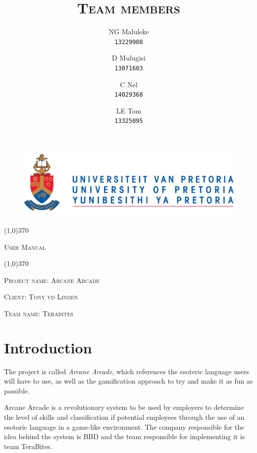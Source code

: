 \documentclass[english]{article}
\title{\scshape\Large Team members}
\author{
	NG Maluleke\\
	\texttt{13229908}
	\and
	D Mulugisi\\
	\texttt{13071603}
	\and
	C Nel\\
	\texttt{14029368}
	\and
	LE Tom\\
	\texttt{13325095}
}
\begin{document}
	
	\begin{figure}
		\includegraphics[width=\linewidth]{up_logo.png}
	\end{figure}
	
	\begin{center}
	 \line(1,0){370}
	\\[0.2cm]
    {\scshape\Large User Manual \par}
	\vspace{0.1cm}
	\line(1,0){370}
	\\[0.8cm]
	
	{\scshape\large Project name: Arcane Arcade\par}	
	\vspace{1cm}
	{\scshape\large Client: Tony vd Linden\par}
	\vspace{1cm}
	{\scshape\large Team name: Terabites\par}
	\vspace{1cm}
	{\let\newpage\relax\maketitle}
	\end{center}
	
	
	\newpage
	\tableofcontents

	\newpage
	
	\section{Introduction}
		 The project is called \textit{Arcane Arcade}, which references the esoteric language users will have to use, as well as the gamification approach to try and make it as fun as possible.
		 
		 Arcane Arcade is a revolutionary system to be used by employers to determine the level of skills and classification if potential employees through the use of an esotoric language in a game-like environment. The company responsible for the idea behind the system is BBD and the team responsible for implementing it is team TeraBites. 
		 
\end{document}
